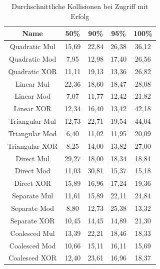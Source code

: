 \begin{table}[h!]
\begin{tabular}{c|cccc}
    Name & 50\% & 90\% & 95\% & 100\% \\
    \hline
    Quadratic Mul & 15,69 & 22,84 & 26,38 & 36,12 \\
    Quadratic Mod & 7,95 & 12,98 & 17,40 & 26,56 \\
    Quadratic XOR & 11,11 & 19,13 & 13,36 & 26,82 \\
    \hline
    Linear Mul & 22,36 & 18,60 & 18,47 & 28,08 \\
    Linear Mod & 7,07 & 11,77 & 12,42 & 21,82 \\
    Linear XOR & 12,34 & 16,40 & 13,42 & 42,18 \\
    \hline
    Triangular Mul & 12,73 & 22,71 & 19,54 & 44,04 \\
    Triangular Mod & 6,40 & 11,02 & 11,95 & 20,09 \\
    Triangular XOR & 8,25 & 14,00 & 13,82 & 27,00 \\
    \hline
    Direct Mul & 29,27 & 18,00 & 18,34 & 18,84 \\
    Direct Mod & 11,03 & 30,81 & 15,37  & 15,18 \\
    Direct XOR & 15,89 & 16,96 & 17,24  & 19,36 \\
    \hline
    Separate Mul & 11,61 & 15,89 & 22,11 & 24,84 \\
    Separate Mod & 8,80 & 12,73 & 25,38 & 13,32 \\
    Separate XOR & 10,45 & 14,45 & 14,89 & 21,30 \\
    \hline
    Coalesced Mul & 13,39 & 22,21 & 18,46 & 18,33 \\
    Coalesced Mod & 10,66 & 15,11 & 16,11 & 15,69 \\
    Coalesced XOR & 12,40 & 23,61 & 16,96 & 18,37 \\
\end{tabular}
\centering
\caption{Durchschnittliche Kollisionen bei Zugriff mit Erfolg}
\end{table}
